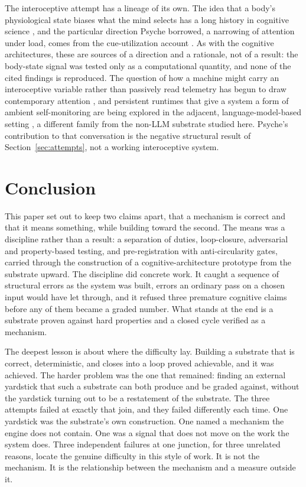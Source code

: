 \documentclass[11pt]{article}
\begin{document}
The interoceptive attempt has a lineage of its own. The idea that a body's physiological
state biases what the mind selects has a long history in cognitive science
\citep{damasio1994descartes, craig2002interoception}, and the particular direction Psyche
borrowed, a narrowing of attention under load, comes from the cue-utilization account
\citep{easterbrook1959effect}. As with the cognitive architectures, these are sources of a
direction and a rationale, not of a result: the body-state signal was tested only as a
computational quantity, and none of the cited findings is reproduced. The question of how a
machine might carry an interoceptive variable rather than passively read telemetry has begun
to draw contemporary attention \citep{candiarivera2026interoceptive}, and persistent
runtimes that give a system a form of ambient self-monitoring are being explored in the
adjacent, language-model-based setting \citep{brady2026springdrift}, a different family from
the non-LLM substrate studied here. Psyche's contribution to that conversation is the
negative structural result of Section~\ref{sec:attempts}, not a working interoceptive
system.

\section{Conclusion}\label{sec:conclusion}

This paper set out to keep two claims apart, that a mechanism is correct and that it means
something, while building toward the second. The means was a discipline rather than a
result: a separation of duties, loop-closure, adversarial and property-based testing, and
pre-registration with anti-circularity gates, carried through the construction of a
cognitive-architecture prototype from the substrate upward. The discipline did concrete
work. It caught a sequence of structural errors as the system was built, errors an ordinary
pass on a chosen input would have let through, and it refused three premature cognitive
claims before any of them became a graded number. What stands at the end is a substrate
proven against hard properties and a closed cycle verified as a mechanism.

The deepest lesson is about where the difficulty lay. Building a substrate that is correct,
deterministic, and closes into a loop proved achievable, and it was achieved. The harder
problem was the one that remained: finding an external yardstick that such a substrate can
both produce and be graded against, without the yardstick turning out to be a restatement
of the substrate. The three attempts failed at exactly that join, and they failed
differently each time. One yardstick was the substrate's own construction. One named a
mechanism the engine does not contain. One was a signal that does not move on the work the
system does. Three independent failures at one junction, for three unrelated reasons, locate
the genuine difficulty in this style of work. It is not the mechanism. It is the
relationship between the mechanism and a measure outside it.
\end{document}
